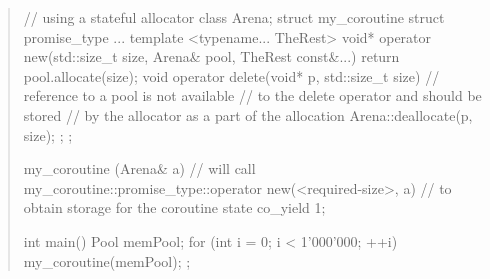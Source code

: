 \begin{quote}
\begin{codeblock}
\end{codeblock}
\exitexample

\pnum
\enterexample
\begin{codeblock}
  // using a stateful allocator
  class Arena;
  struct my_coroutine {
    struct promise_type {
      ...
      template <typename... TheRest>
      void* operator new(std::size_t size, Arena& pool, TheRest const&...) {
        return pool.allocate(size);
      }
      void operator delete(void* p, std::size_t size) {
      	// reference to a pool is not available
      	// to the delete operator and should be stored
      	// by the allocator as a part of the allocation
        Arena::deallocate(p, size);
      }
    };
  };
  
  my_coroutine (Arena& a) {
    // will call my_coroutine::promise_type::operator new(<required-size>, a)
    // to obtain storage for the coroutine state
    co_yield 1;
  }
  
  int main() {
    Pool memPool;
    for (int i = 0; i < 1'000'000; ++i) my_coroutine(memPool);
  };
\end{codeblock}
\exitexample
\end{quote}
